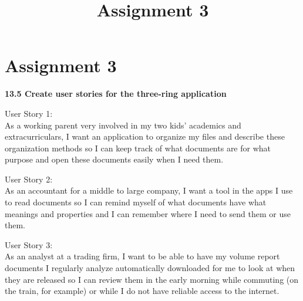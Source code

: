 \documentclass[12pt]{article}
\begin{document}
\title{Assignment 3}

% 

\section*{Assignment 3}
\textbf{13.5 Create user stories for the three-ring application}

User Story 1:\\
As a working parent very involved in my two kids' academics and extracurriculars, I want an application to organize my files and describe these organization methods so I can keep track of what documents are for what purpose and open these documents easily when I need them.

User Story 2:\\
As an accountant for a middle to large company, I want a tool in the apps I use to read documents so I can remind myself of what documents have what meanings and properties and I can remember where I need to send them or use them. 

User Story 3:\\
As an analyst at a trading firm, I want to be able to have my volume report documents I regularly analyze automatically downloaded for me to look at when they are released so I can review them in the early morning while commuting (on the train, for example) or while I do not have reliable access to the internet.
\end{document}
